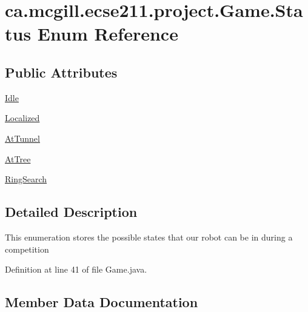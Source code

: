 \hypertarget{enumca_1_1mcgill_1_1ecse211_1_1project_1_1_game_1_1_status}{}\section{ca.\+mcgill.\+ecse211.\+project.\+Game.\+Status Enum Reference}
\label{enumca_1_1mcgill_1_1ecse211_1_1project_1_1_game_1_1_status}
\subsection*{Public Attributes}
\begin{DoxyCompactItemize}
\item 
\hyperlink{enumca_1_1mcgill_1_1ecse211_1_1project_1_1_game_1_1_status_a4ee6ac6711e6f0f96cfbe832f260c89f}{Idle}
\item 
\hyperlink{enumca_1_1mcgill_1_1ecse211_1_1project_1_1_game_1_1_status_a7d3a789bd51e152bd2643e7214a178f8}{Localized}
\item 
\hyperlink{enumca_1_1mcgill_1_1ecse211_1_1project_1_1_game_1_1_status_a7ebcaa409a8a78b543975cca230f51a3}{At\+Tunnel}
\item 
\hyperlink{enumca_1_1mcgill_1_1ecse211_1_1project_1_1_game_1_1_status_ae3a62c62aab81b3a4ada7940139ff936}{At\+Tree}
\item 
\hyperlink{enumca_1_1mcgill_1_1ecse211_1_1project_1_1_game_1_1_status_a6cb7397203bf9fa47c9486ede1e8fd6d}{Ring\+Search}
\end{DoxyCompactItemize}


\subsection{Detailed Description}
This enumeration stores the possible states that our robot can be in during a competition 

Definition at line 41 of file Game.\+java.



\subsection{Member Data Documentation}
\mbox{\label{enumca_1_1mcgill_1_1ecse211_1_1project_1_1_game_1_1_status_ae3a62c62aab81b3a4ada7940139ff936}} 
